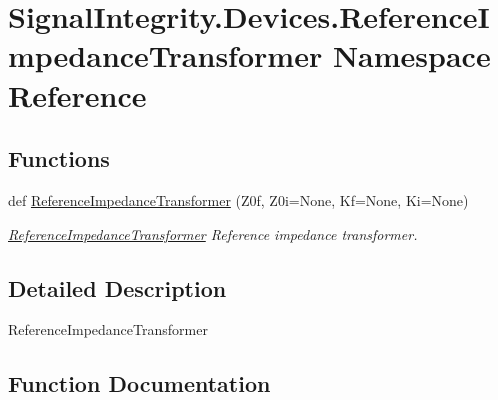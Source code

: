 \hypertarget{namespaceSignalIntegrity_1_1Devices_1_1ReferenceImpedanceTransformer}{}\section{Signal\+Integrity.\+Devices.\+Reference\+Impedance\+Transformer Namespace Reference}
\label{namespaceSignalIntegrity_1_1Devices_1_1ReferenceImpedanceTransformer}
\subsection*{Functions}
\begin{DoxyCompactItemize}
\item 
def \hyperlink{namespaceSignalIntegrity_1_1Devices_1_1ReferenceImpedanceTransformer_a9e41bb15210406f67383bb87c8009440}{Reference\+Impedance\+Transformer} (Z0f, Z0i=None, Kf=None, Ki=None)
\begin{DoxyCompactList}\small\item\em \hyperlink{namespaceSignalIntegrity_1_1Devices_1_1ReferenceImpedanceTransformer}{Reference\+Impedance\+Transformer} Reference impedance transformer. \end{DoxyCompactList}\end{DoxyCompactItemize}


\subsection{Detailed Description}
\begin{DoxyVerb}ReferenceImpedanceTransformer\end{DoxyVerb}
 

\subsection{Function Documentation}
\mbox{\label{namespaceSignalIntegrity_1_1Devices_1_1ReferenceImpedanceTransformer_a9e41bb15210406f67383bb87c8009440}} 
